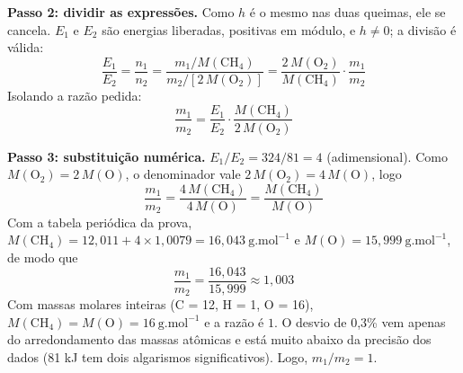 \documentclass{article}%
\begin{document}
\textbf{Passo 2: dividir as expressões.} Como $h$ é o mesmo nas duas queimas, ele se cancela. $E_1$ e $E_2$ são energias liberadas, positivas em módulo, e $h\neq 0$; a divisão é válida:
\[
\frac{E_1}{E_2}=\frac{n_1}{n_2}=\frac{m_1/M(\mathrm{CH_4})}{m_2/[2\,M(\mathrm{O_2})]}=\frac{2\,M(\mathrm{O_2})}{M(\mathrm{CH_4})}\cdot\frac{m_1}{m_2}
\]
Isolando a razão pedida:
\[
\frac{m_1}{m_2}=\frac{E_1}{E_2}\cdot\frac{M(\mathrm{CH_4})}{2\,M(\mathrm{O_2})}
\]

\textbf{Passo 3: substituição numérica.} $E_1/E_2=324/81=4$ (adimensional). Como $M(\mathrm{O_2})=2\,M(\mathrm{O})$, o denominador vale $2\,M(\mathrm{O_2})=4\,M(\mathrm{O})$, logo
\[
\frac{m_1}{m_2}=\frac{4\,M(\mathrm{CH_4})}{4\,M(\mathrm{O})}=\frac{M(\mathrm{CH_4})}{M(\mathrm{O})}
\]
Com a tabela periódica da prova, $M(\mathrm{CH_4})=12{,}011+4\times 1{,}0079=16{,}043\ \text{g.mol}^{-1}$ e $M(\mathrm{O})=15{,}999\ \text{g.mol}^{-1}$, de modo que
\[
\frac{m_1}{m_2}=\frac{16{,}043}{15{,}999}\approx 1{,}003
\]
Com massas molares inteiras (C = 12, H = 1, O = 16), $M(\mathrm{CH_4})=M(\mathrm{O})=16\ \text{g.mol}^{-1}$ e a razão é $1$. O desvio de 0,3\% vem apenas do arredondamento das massas atômicas e está muito abaixo da precisão dos dados (81 kJ tem dois algarismos significativos). Logo, $m_1/m_2=1$.
\end{document}

